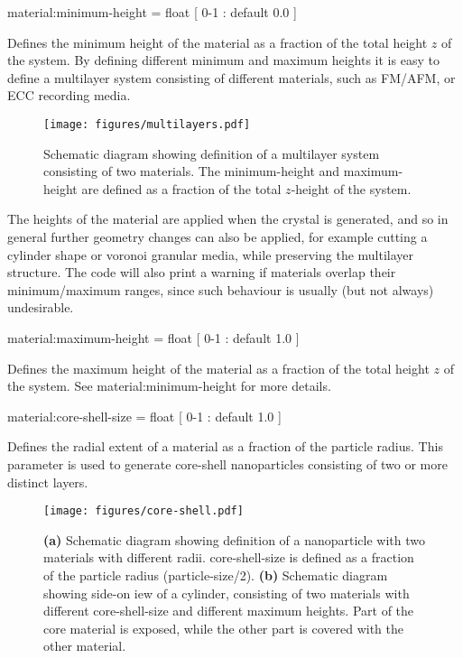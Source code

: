 {\zicf material:minimum-height = float [ 0-1 : default 0.0 ]} Defines the minimum height of the material as a fraction of the total height $z$ of the system. By defining different minimum and maximum heights it is easy to define a multilayer system consisting of different materials, such as FM/AFM, or ECC recording media.

\begin{figure*}[!h]
\center
\texttt{[image: figures/multilayers.pdf]}
\caption{Schematic diagram showing definition of a multilayer system consisting of two materials. The minimum-height and maximum-height are defined as a fraction of the total $z$-height of the system.}
\label{fig:multilayer}
\end{figure*}

The heights of the material are applied when the crystal is generated, and so in general further geometry changes can also be applied, for example cutting a cylinder shape or voronoi granular media, while preserving the multilayer structure. The code will also print a warning if materials overlap their minimum/maximum ranges, since such behaviour is usually (but not always) undesirable.

{\zicf material:maximum-height = float [ 0-1 : default 1.0 ]} Defines the maximum height of the material as a fraction of the total height $z$ of the system. See material:minimum-height for more details.

{\zicf material:core-shell-size = float [ 0-1 : default 1.0 ]} Defines the radial extent of a material as a fraction of the particle radius. This parameter is used to generate core-shell nanoparticles consisting of two or more distinct layers.

\begin{figure*}[!htb]
\center
\texttt{[image: figures/core-shell.pdf]}
\caption{\textbf{(a)} Schematic diagram showing definition of a nanoparticle with two materials with different radii. core-shell-size is defined as a fraction of the particle radius (particle-size/2). \textbf{(b)} Schematic diagram showing side-on iew of a cylinder, consisting of two materials with different core-shell-size and different maximum heights. Part of the core material is exposed, while the other part is covered with the other material.}
\label{fig:core-shell}
\end{figure*}

